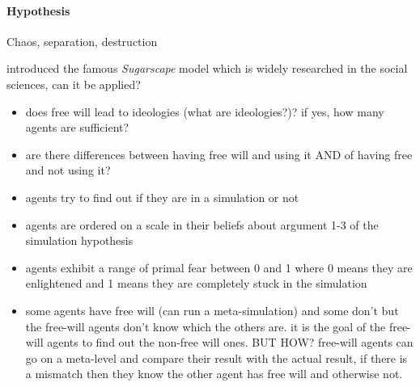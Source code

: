 \paragraph{Hypothesis} Chaos, separation, destruction

\cite{epstein_growing_1996} introduced the famous \textit{Sugarscape} model which is widely researched in the social sciences, can it be applied?

\begin{itemize}
	\item does free will lead to ideologies (what are ideologies?)? if yes, how many agents are sufficient?
	\item are there differences between having free will and using it AND of having free and not using it?
	\item agents try to find out if they are in a simulation or not
	\item agents are ordered on a scale in their beliefs about argument 1-3 of the simulation hypothesis 
	\item agents exhibit a range of primal fear between 0 and 1 where 0 means they are enlightened and 1 means they are completely stuck in the simulation
	\item some agents have free will (can run a meta-simulation) and some don't but the free-will agents don't know which the others are. it is the goal of the free-will agents to find out the non-free will ones. BUT HOW? free-will agents can go on a meta-level and compare their result with the actual result, if there is a mismatch then they know the other agent has free will and otherwise not.
\end{itemize}
